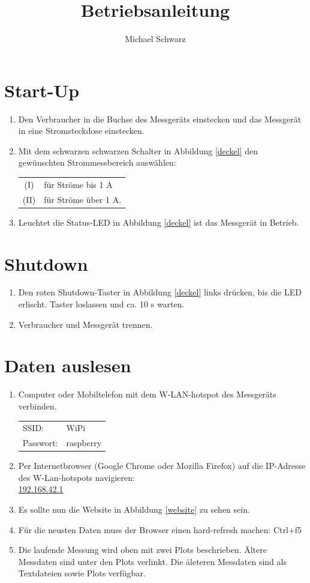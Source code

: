 \documentclass[a4paper]{article}
\title{Betriebsanleitung}
\author{Michael Schwarz}
\begin{document}
\maketitle

\section{Start-Up}
\begin{enumerate}
\item Den Verbraucher in die Buchse des Messgeräts einstecken und das Messgerät in eine Stromsteckdose einstecken.
\item Mit dem schwarzen schwarzen Schalter in Abbildung \ref{deckel} den gewünschten Strommessbereich auswählen: \\
	\begin{tabular}{c l}
		(I)  & für Ströme bis 1 A   \\
		(II) & für Ströme über 1 A. \\
	\end{tabular}
\item Leuchtet die Status-LED in Abbildung \ref{deckel} ist das Messgerät in Betrieb.
\end{enumerate}

\section{Shutdown}
\begin{enumerate}
	\item Den roten Shutdown-Taster in Abbildung \ref{deckel} links drücken, bis die LED erlischt. 
		Taster loslassen und ca. 10 s warten.
	\item Verbraucher und Messgerät trennen.
\end{enumerate}

\section{Daten auslesen}
\begin{enumerate}
	\item Computer oder Mobiltelefon mit dem W-LAN-hotspot des Messgeräts verbinden. \\
		\begin{tabular}{l l}
			SSID:     & WiPi      \\
			Passwort: & raspberry \\
		\end{tabular}
	\item Per Internetbrowser (Google Chrome oder Mozilla Firefox) auf die IP-Adresse des W-Lan-hotspots navigieren: \\
		\url{192.168.42.1}
	\item Es sollte nun die Website in Abbildung \ref{website} zu sehen sein.
	\item Für die neusten Daten muss der Browser einen hard-refresh machen: Ctrl+f5
	\item Die laufende Messung wird oben mit zwei Plots beschrieben. 
		Ältere Messdaten sind unter den Plots verlinkt.
		Die äleteren Messdaten sind als Textdateien sowie Plots verfügbar.
\end{enumerate}
\end{document}
